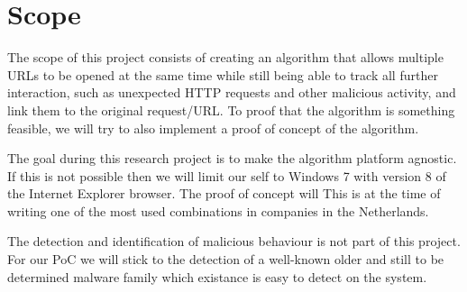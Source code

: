 \documentclass{scrartcl}
\begin{document}



\section{Scope}

The scope of this project consists of creating an algorithm that allows multiple URLs to be opened at the same time while still being able to track all further interaction, such as unexpected HTTP requests and other malicious activity, and link them to the original request/URL. To proof that the algorithm is something feasible, we will try to also implement a proof of concept of the algorithm.

The goal during this research project is to make the algorithm platform agnostic. If this is not possible then we will limit our self to Windows 7 with version 8 of the Internet Explorer browser. The proof of concept will This is at the time of writing one of the most used combinations in companies in the Netherlands.

The detection and identification of malicious behaviour is not part of this project. For our PoC we will stick to the detection of a well-known older and still to be determined malware family which existance is easy to detect on the system. 
\end{document}
